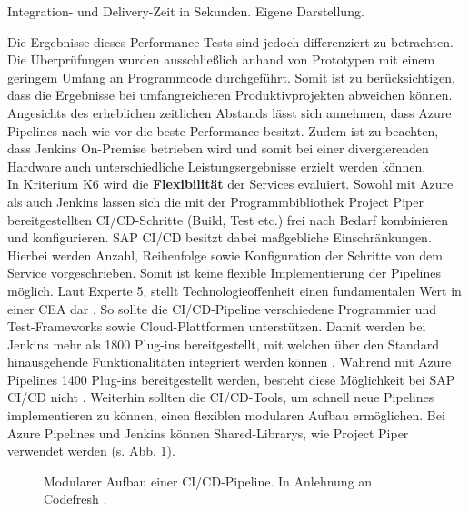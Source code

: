  \begin{center}
	\begin{table}[H]
		\centering
		\caption[Integration- und Delivery-Zeit in Sekunden]{Integration- und Delivery-Zeit in Sekunden. Eigene Darstellung.}
		\label{tab:Performance}
	\end{table}
\end{center}
\vspace*{-15mm}
 Die Ergebnisse dieses Performance-Tests sind jedoch differenziert zu betrachten. Die Überprüfungen wurden ausschließlich anhand von Prototypen mit einem geringem Umfang an Programmcode durchgeführt. Somit ist zu berücksichtigen, dass die Ergebnisse bei umfangreicheren Produktivprojekten abweichen können. Angesichts des erheblichen zeitlichen Abstands lässt sich annehmen, dass Azure Pipelines nach wie vor die beste Performance besitzt. Zudem ist zu beachten, dass Jenkins On-Premise betrieben wird und somit bei einer divergierenden Hardware auch unterschiedliche Leistungsergebnisse erzielt werden können.\\ In Kriterium K6 wird die \textbf{Flexibilität} der Services evaluiert. Sowohl mit Azure als auch Jenkins lassen sich die mit der Programmbibliothek Project Piper bereitgestellten CI/CD-Schritte (Build, Test etc.) frei nach Bedarf kombinieren und konfigurieren. SAP CI/CD besitzt dabei maßgebliche Einschränkungen. Hierbei werden Anzahl, Reihenfolge sowie Konfiguration der Schritte von dem Service vorgeschrieben. Somit ist keine flexible Implementierung der Pipelines möglich. Laut Experte 5, stellt Technologieoffenheit einen fundamentalen Wert in einer CEA dar \cite[Z. 13 ff.]{SoftwareArchitektSAPDTSIntegration.}. So sollte die CI/CD-Pipeline verschiedene Programmier und Test-Frameworks sowie Cloud-Plattformen unterstützen. Damit werden bei Jenkins mehr als 1800 Plug-ins bereitgestellt, mit welchen über den Standard hinausgehende Funktionalitäten integriert werden können \cite{.20230410c}. Während mit Azure Pipelines 1400 Plug-ins bereitgestellt werden, besteht diese Möglichkeit bei SAP CI/CD nicht \cite{.20230410d}. Weiterhin sollten die CI/CD-Tools, um schnell neue Pipelines implementieren zu können, einen flexiblen modularen Aufbau ermöglichen. Bei Azure Pipelines und Jenkins können Shared-Librarys, wie Project Piper verwendet werden (s. Abb. \ref{fig:Modular}).
 \begin{center}
	\begin{figure}[H]
		\centering
		\caption[Modularer Aufbau einer CI/CD-Pipeline]{Modularer Aufbau einer CI/CD-Pipeline. In Anlehnung an Codefresh \cite{.20230402}.}
		\label{fig:Modular}
	\end{figure}
\end{center}
